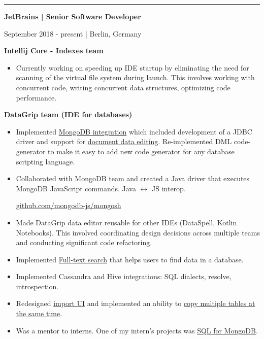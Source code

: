 \documentclass[9pt]{article}
\begin{document}
\begin{multicols}{2}
\vspace{0.5em}

\hrule

\vspace{1em}

{\textbf{JetBrains | Senior Software Developer}}

\color{gray} September 2018 - present | Berlin, Germany \color{black}

\vspace{1.3em}
\hspace{2.2em} {\textbf{Intellij Core - Indexes team}}
\begin{itemize}
    \item Currently working on speeding up IDE startup by eliminating the need for scanning of the virtual file system during launch. This involves working with concurrent code, writing concurrent data structures, optimizing code performance.
\end{itemize}

\vspace{0.8em}
\hspace{2.2em} {\textbf{DataGrip team (IDE for databases)}}
\begin{itemize}
\item Implemented \href{https://www.jetbrains.com/datagrip/whatsnew/2019-3/#version-2019-3-mongodb-support}{MongoDB integration} which included development of a JDBC driver and support for \href{https://www.jetbrains.com/datagrip/whatsnew/2021-1/#version-2021-1-data-editor}{document data editing}. Re-implemented DML code-generator to make it easy to add new code generator for any database scripting language.
\item Collaborated with MongoDB team and created a Java driver that executes MongoDB JavaScript commands. Java \(\leftrightarrow\) JS interop.

\href{https://github.com/mongodb-js/mongosh/tree/main/packages/java-shell}{github.com/mongodb-js/mongosh}
\item Made DataGrip data editor reusable for other IDEs (DataSpell, Kotlin Notebooks). This involved coordinating design decisions across multiple teams and conducting significant code refactoring.
\item Implemented \href{https://www.jetbrains.com/datagrip/whatsnew/2019-2/#version-2019-2-full-text-search}{Full-text search} that helps users to find data in a database.
\item Implemented Cassandra and Hive integrations: SQL dialects, resolve, introspection.
\item Redesigned \href{https://www.jetbrains.com/datagrip/whatsnew/2021-3/#importexport}{import UI} and implemented an ability to \href{https://www.jetbrains.com/datagrip/whatsnew/2022-1/#importexport}{copy multiple tables at the same time}.
\item Was a mentor to interns. One of my intern's projects was \href{https://www.jetbrains.com/datagrip/whatsnew/2020-3/#version-2020-3-sql-for-mongodb}{SQL for MongoDB}.
\end{itemize}


\end{multicols}
\end{document}
